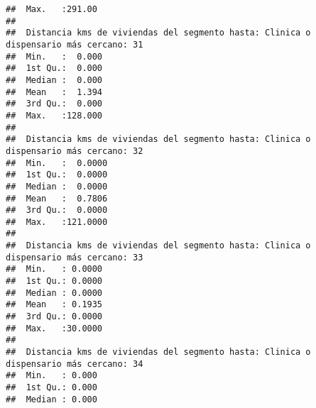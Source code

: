 \documentclass[11pt,]{article}
\begin{document}
\begin{verbatim}
##  Max.   :291.00                                                                      
##                                                                                      
##  Distancia kms de viviendas del segmento hasta: Clinica o dispensario más cercano: 31
##  Min.   :  0.000                                                                     
##  1st Qu.:  0.000                                                                     
##  Median :  0.000                                                                     
##  Mean   :  1.394                                                                     
##  3rd Qu.:  0.000                                                                     
##  Max.   :128.000                                                                     
##                                                                                      
##  Distancia kms de viviendas del segmento hasta: Clinica o dispensario más cercano: 32
##  Min.   :  0.0000                                                                    
##  1st Qu.:  0.0000                                                                    
##  Median :  0.0000                                                                    
##  Mean   :  0.7806                                                                    
##  3rd Qu.:  0.0000                                                                    
##  Max.   :121.0000                                                                    
##                                                                                      
##  Distancia kms de viviendas del segmento hasta: Clinica o dispensario más cercano: 33
##  Min.   : 0.0000                                                                     
##  1st Qu.: 0.0000                                                                     
##  Median : 0.0000                                                                     
##  Mean   : 0.1935                                                                     
##  3rd Qu.: 0.0000                                                                     
##  Max.   :30.0000                                                                     
##                                                                                      
##  Distancia kms de viviendas del segmento hasta: Clinica o dispensario más cercano: 34
##  Min.   : 0.000                                                                      
##  1st Qu.: 0.000                                                                      
##  Median : 0.000                                                                      

\end{verbatim}
\end{document}
